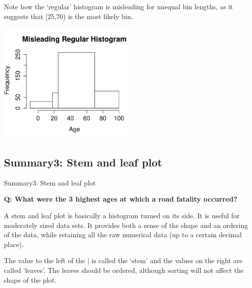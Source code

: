 \documentclass[t,xcolor=pdftex,dvipsnames,table]{beamer}\usepackage[]{graphicx}\usepackage[]{color}
\begin{document}
\begin{frame}[fragile]{}
Note how the `regular' histogram is misleading for unequal bin lengths, as it suggests that [25,70) is the most likely bin.


\vspace{.5cm}
\includegraphics[height=6cm]{../images/AgeMisleadingHist.pdf}
\end{frame}

\subsection[]{Summary3: Stem and leaf plot}
\begin{frame}[fragile]{Summary3: Stem and leaf plot}

{\bf Q: What were the 3 highest ages at which a road fatality occurred?}

\vspace{.5cm}
A stem and leaf plot is basically a histogram turned on its side. It is useful for moderately sized data sets. It provides both a sense of the shape and an ordering of the data, while retaining all the raw numerical data (up to a certain decimal place). 

\vspace{.5cm}
The value to the left of the $\mid$ is called the ‘stem’ and the values on the right are called ‘leaves’.
The leaves should be ordered, although sorting will not affect the shape of the plot.
\end{frame}
\end{document}
